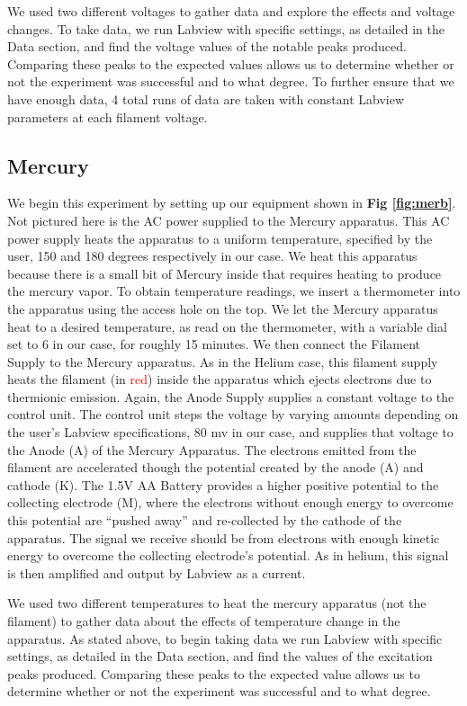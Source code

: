 \documentclass[%
 reprint,
 amsmath,amssymb,
 aps,
]{revtex4-1}
\begin{document}
We used two different voltages to gather data and explore the effects and voltage changes. To take data, we run Labview with specific settings, as detailed in the Data section, and find the voltage values of the notable peaks produced. Comparing these peaks to the expected values allows us to determine whether or not the experiment was successful and to what degree. To further ensure that we have enough data, 4 total runs of data are taken with constant Labview parameters at each filament voltage.


\subsection{\label{sec:hel}Mercury}

We begin this experiment by setting up our equipment shown in \textbf{Fig \ref{fig:merb}}. Not pictured here is the AC power supplied to the Mercury apparatus. This AC power supply heats the apparatus to a uniform temperature, specified by the user, 150 and 180 degrees respectively in our case. We heat this apparatus because there is a small bit of Mercury inside that requires heating to produce the mercury vapor. To obtain temperature readings, we insert a thermometer into the apparatus using the access hole on the top. We let the Mercury apparatus heat to a desired temperature, as read on the thermometer, with a variable dial set to 6 in our case, for roughly 15 minutes. We then connect the Filament Supply to the Mercury apparatus. As in the Helium case, this filament supply heats the filament (in \textcolor{red}{red}) inside the apparatus which ejects electrons due to thermionic emission. Again, the Anode Supply supplies a constant voltage to the control unit. The control unit steps the voltage by varying amounts depending on the user's Labview specifications, 80 mv in our case, and supplies that voltage to the Anode (A) of the Mercury Apparatus. The electrons emitted from the filament are accelerated though the potential created by the anode (A) and cathode (K). The 1.5V AA Battery provides a higher positive potential to the collecting electrode (M), where the electrons without enough energy to overcome this potential are ``pushed away'' and re-collected by the cathode of the apparatus. The signal we receive should be from electrons with enough kinetic energy to overcome the collecting electrode's potential. As in helium, this signal is then amplified and output by Labview as a current.

We used two different temperatures to heat the mercury apparatus (not the filament) to gather data about the effects of temperature change in the apparatus. As stated above, to begin taking data we run Labview with specific settings, as detailed in the Data section, and find the values of the excitation peaks produced. Comparing these peaks to the expected value allows us to determine whether or not the experiment was successful and to what degree.
\end{document}
